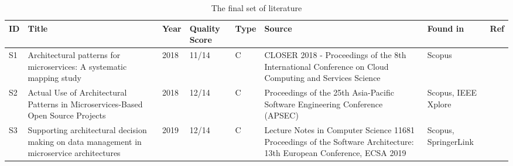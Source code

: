 \documentclass{bmcart}
\begin{document}
\begin{table}[!ht]
  \renewcommand{\arraystretch}{1.5}
  \caption[]{The final set of literature}
  \begin{tabular}{|p{0.3cm}|p{4cm}|p{0.7cm}|p{0.8cm}|p{0.5cm}|p{2cm}|p{1cm}|p{0.5cm}|}
      \hline
      ID & Title & Year & Quality Score & Type & Source & Found in & Ref  \\ 

      \hline

      S1 & Architectural patterns for microservices: A systematic mapping study & 2018 & 11/14 & C & CLOSER 2018 - Proceedings of the 8th International Conference on Cloud Computing and Services Science & Scopus & \cite{Taibi.2018} \\ 
      \hline
      S2 & Actual Use of Architectural Patterns in Microservices-Based Open Source Projects & 2018 & 12/14 & C & Proceedings of the 25th Asia-Pacific Software Engineering Conference (APSEC) & Scopus, IEEE Xplore & \cite{Marquez.2018}  \\ 
      \hline  
      S3 & Supporting architectural decision making on data management in microservice architectures & 2019 & 12/14 & C & Lecture Notes in Computer Science 11681
      Proceedings of the Software Architecture: 13th European Conference, ECSA 2019 & Scopus, SpringerLink & \cite{Ntentos.2019}  \\ 


\end{tabular}
\end{table}
\end{document}
